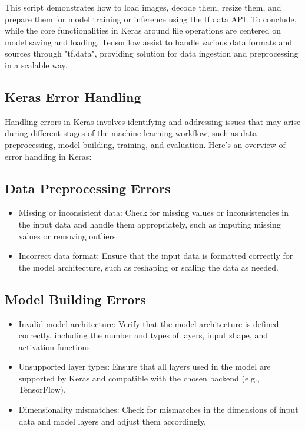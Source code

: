 	This script demonstrates how to load images, decode them, resize them, and prepare them for model training or inference using the tf.data API. 
	To conclude, while the core functionalities in Keras around file operations are centered on model saving and loading. Tensorflow assist to handle various data formats and sources through "tf.data", providing solution for data ingestion and preprocessing in a scalable way. 
	
		\subsection{Keras Error Handling}
		
		Handling errors in Keras involves identifying and addressing issues that may arise during different stages of the machine learning workflow, such as data preprocessing, model building, training, and evaluation. Here's an overview of error handling in Keras\cite{Err:2024}:
		


			\subsection*{Data Preprocessing Errors}
			\begin{itemize}
				\item Missing or inconsistent data: Check for missing values or inconsistencies in the input data and handle them appropriately, such as imputing missing values or removing outliers.
				\item Incorrect data format: Ensure that the input data is formatted correctly for the model architecture, such as reshaping or scaling the data as needed.
			\end{itemize}
			
			\subsection*{Model Building Errors}
			\begin{itemize}
				\item Invalid model architecture: Verify that the model architecture is defined correctly, including the number and types of layers, input shape, and activation functions.
				\item Unsupported layer types: Ensure that all layers used in the model are supported by Keras and compatible with the chosen backend (e.g., TensorFlow).
				\item Dimensionality mismatches: Check for mismatches in the dimensions of input data and model layers and adjust them accordingly. \cite{Hand:2024}
			\end{itemize}
			
